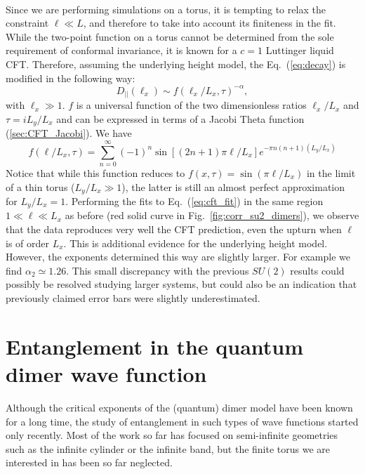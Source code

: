 \documentclass[11pt]{iopart}
\begin{document}
\paragraph{}
Since we are performing simulations on a torus, it is tempting to relax the constraint $\ell \ll L$, and therefore to take into account its finiteness in the fit. While the two-point function on a torus cannot be determined from the sole requirement of conformal invariance, it is known for a $c=1$ Luttinger liquid CFT\cite{BigYellowBook}. Therefore, assuming the underlying height model, the Eq.~(\ref{eq:decay}) is modified in the following way:
\begin{equation}\label{eq:cft_fit}
 D_{||}(\ell_x)\sim f(\ell_x/L_x,\tau)^{-\alpha},
\end{equation}
with $\ell_x \gg 1$. $f$ is a universal function of the two dimensionless ratios $\ell_x/L_x$ and $\tau =i L_y/L_x$ and can be expressed in terms of a Jacobi Theta function (\ref{sec:CFT_Jacobi}). We have 
\begin{equation}
 f(\ell/L_x,\tau)=\sum_{n=0}^{\infty}(-1)^n \sin \left[(2n+1)\pi \ell/L_x\right]e^{-\pi n(n+1)(L_y/L_x)}
\end{equation}
Notice that while this function reduces to $f(x,\tau)=\sin(\pi \ell/L_x)$ in the limit of a thin torus ($L_y/L_x \gg 1$), the latter is still an almost perfect approximation for $L_y/L_x=1$. Performing the fits to Eq.~(\ref{eq:cft_fit}) in the same region $1\ll \ell \ll L_x$ as before (red solid curve in Fig.~\ref{fig:corr_su2_dimers}), we observe that the data reproduces very well the CFT prediction, even the upturn when $\ell$ is of order $L_x$. This is additional evidence for the underlying height model. However, the exponents determined this way are slightly larger. For example we find $\alpha_2\simeq 1.26$. This small discrepancy with the previous $SU(2)$ results\cite{RVB1,RVB2} could possibly be resolved studying larger systems, but could also be an indication that previously claimed error bars were slightly underestimated.  
  \section{Entanglement in the quantum dimer wave function}
\label{sec:dimers_entanglement}
Although the critical exponents of the (quantum) dimer model have been known for a long time, the study of entanglement in such types of wave functions started only recently\cite{Moore06,Hsu09,Misguich,Oshikawa,Zaletel,Stephan11}. Most of the work so far has focused on semi-infinite geometries such as the infinite cylinder\cite{Hsu09,Misguich,Oshikawa} or the infinite band\cite{Moore06,Zaletel,Stephan11}, but the finite torus we are interested in has been so far neglected.
\end{document}
